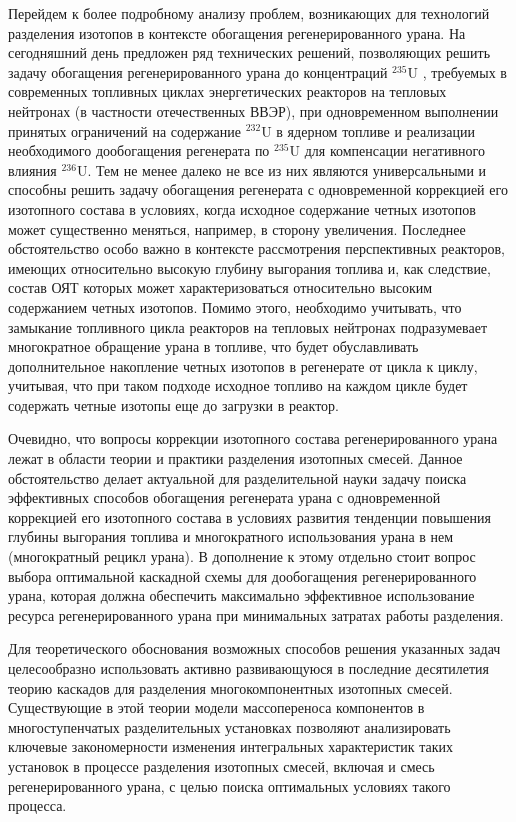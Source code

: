 Перейдем к более подробному анализу проблем, возникающих для технологий разделения изотопов в контексте обогащения регенерированного урана. На сегодняшний день предложен ряд технических решений, позволяющих решить задачу обогащения регенерированного урана до концентраций $^{235}$U , требуемых в современных топливных циклах энергетических реакторов на тепловых нейтронах (в частности отечественных ВВЭР), при одновременном выполнении принятых ограничений на содержание $^{232}$U в ядерном топливе и реализации необходимого дообогащения регенерата по $^{235}$U для компенсации негативного влияния $^{236}$U. Тем не менее далеко не все из них являются универсальными и способны решить задачу обогащения регенерата с одновременной коррекцией его изотопного состава в условиях, когда исходное содержание четных изотопов может существенно меняться, например, в сторону увеличения. Последнее обстоятельство особо важно в контексте рассмотрения перспективных реакторов, имеющих относительно высокую глубину выгорания топлива и, как следствие, состав ОЯТ которых может характеризоваться относительно высоким содержанием четных изотопов. Помимо этого, необходимо учитывать, что замыкание топливного цикла реакторов на тепловых нейтронах подразумевает многократное обращение урана в топливе, что будет обуславливать дополнительное накопление четных изотопов в регенерате от цикла к циклу, учитывая, что при таком подходе исходное топливо на каждом цикле будет содержать четные изотопы еще до загрузки в реактор.

Очевидно, что вопросы коррекции изотопного состава регенерированного урана лежат в области теории и практики разделения изотопных смесей. Данное обстоятельство делает актуальной для разделительной науки задачу поиска эффективных способов обогащения регенерата урана с одновременной коррекцией его изотопного состава в условиях развития тенденции повышения глубины выгорания топлива и многократного использования урана в нем (многократный рецикл урана). В дополнение к этому отдельно стоит вопрос выбора оптимальной каскадной схемы для дообогащения регенерированного урана, которая должна обеспечить максимально эффективное использование ресурса регенерированного урана при минимальных затратах работы разделения.

Для теоретического обоснования возможных способов решения указанных задач целесообразно использовать активно развивающуюся в последние десятилетия теорию каскадов для разделения многокомпонентных изотопных смесей. Существующие в этой теории модели массопереноса компонентов в многоступенчатых разделительных установках позволяют анализировать ключевые закономерности изменения интегральных характеристик таких установок в процессе разделения изотопных смесей, включая и смесь регенерированного урана, с целью поиска оптимальных условиях такого процесса.
 


